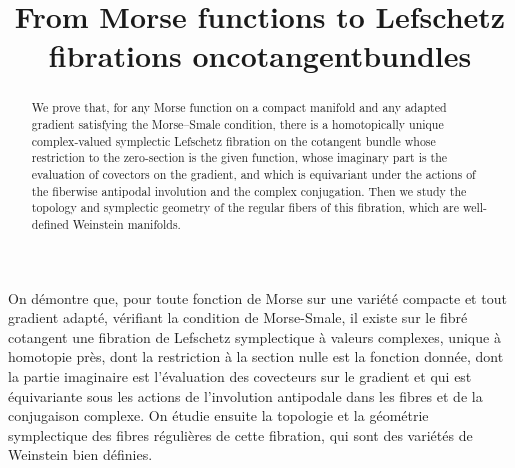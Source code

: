 \documentclass[JEP,XML,SOM,Unicode]{cedram}
\theoremstyle{plain}
\theoremstyle{definition}
\begin{document}
\frontmatter
\title[From Morse functions to Lefschetz fibrations on cotangent bundles]{From Morse functions to Lefschetz fibrations on\nobreakspace cotangent\nobreakspace bundles}

\author[\initial{E.} \lastname{Giroux}]{ }
\address{CNRS and ENS--PSL (DMA, UMR 8553),\\
F-75005 Paris, France}
\urladdr{}

\begin{abstract}
We prove that, for any Morse function on a compact manifold and any adapted gradient satisfying the Morse--Smale condition, there is a homotopically unique complex-valued symplectic Lefschetz fibration on the cotangent bundle whose restriction to the zero-section is the given function, whose imaginary part is the evaluation of covectors on the gradient, and which is equivariant under the actions of the fiberwise antipodal involution and the complex conjugation. Then we study the topology and symplectic geometry of the regular fibers of this fibration, which are well-defined Weinstein manifolds.
\end{abstract}





\begin{altabstract}
On démontre que, pour toute fonction de Morse sur une variété compacte et tout gradient adapté, vérifiant la condition de Morse-Smale, il existe sur le fibré cotangent une fibration de Lefschetz symplectique à valeurs complexes, unique à homotopie près, dont la restriction à la section nulle est la fonction donnée, dont la partie imaginaire est l'évaluation des covecteurs sur le gradient et qui est équivariante sous les actions de l'involution antipodale dans les fibres et de la conjugaison complexe. On étudie ensuite la topologie et la géométrie symplectique des fibres régulières de cette fibration, qui sont des variétés de Weinstein bien définies.
\end{altabstract}
\end{document}
